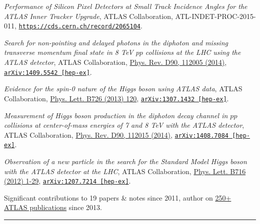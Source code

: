\documentclass{letter}
\begin{document}
\textit{Performance of Silicon Pixel Detectors at Small Track Incidence Angles for the ATLAS Inner Tracker Upgrade}, ATLAS Collaboration, ATL-INDET-PROC-2015-011, \href{https://cds.cern.ch/record/2065104}{\texttt{https://cds.cern.ch/record/2065104}}.

\textit{Search for non-pointing and delayed photons in the diphoton and missing transverse momentum final state in 8 TeV $pp$ collisions at the LHC using the ATLAS detector}, ATLAS Collaboration, 
\href{http://journals.aps.org/prd/abstract/10.1103/PhysRevD.90.112005}{Phys. Rev. D90, 112005 (2014)}, \href{https://arxiv.org/abs/1409.5542}{\texttt{arXiv:1409.5542 [hep-ex]}}.

\textit{Evidence for the spin-0 nature of the Higgs boson using ATLAS data}, ATLAS Collaboration, \href{http://www.sciencedirect.com/science/article/pii/S0370269313006527?np=y}{Phys. Lett. B726 (2013) 120}, \href{https://arxiv.org/abs/1307.1432}{\texttt{arXiv:1307.1432 [hep-ex]}}.

\textit{Measurement of Higgs boson production in the diphoton decay channel in $pp$ collisions at center-of-mass energies of 7 and 8 TeV with the ATLAS detector}, ATLAS Collaboration, \href{http://journals.aps.org/prd/abstract/10.1103/PhysRevD.90.112015}{Phys. Rev. D90, 112015 (2014)}, \href{http://arxiv.org/abs/1408.7084}{\texttt{arXiv:1408.7084 [hep-ex]}}.

\textit{Observation of a new particle in the search for the Standard Model Higgs boson with the ATLAS detector at the LHC}, ATLAS Collaboration, \href{http://www.sciencedirect.com/science/article/pii/S037026931200857X}{Phys. Lett. B716 (2012) 1-29}, \href{https://arxiv.org/abs/1207.7214}{\texttt{arXiv:1207.7214 [hep-ex]}}.

\begin{flushright}
Significant contributions to 19 papers \& notes since 2011, author on \href{https://twiki.cern.ch/twiki/bin/view/AtlasPublic}{250+ ATLAS publications} since 2013.\\
\end{flushright}

\begin{flushleft}
\Large{\textsc{\textbf{\color{Maroon}{Conference Presentations}}}}
\vspace{1pt} %
\hrule
\end{flushleft}
\end{document}

